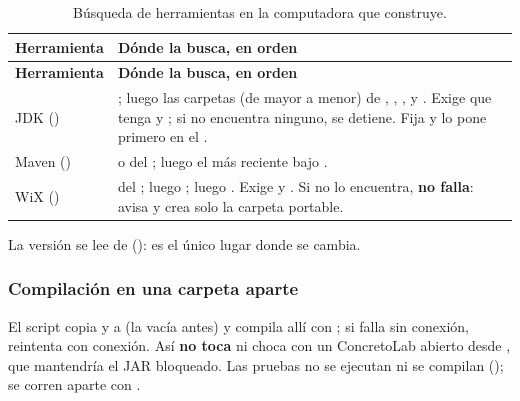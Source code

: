 \begin{longtable}{L{2.2cm}L{12.6cm}}
	\caption{Búsqueda de herramientas en la computadora que construye.} \label{tab:dis-herramientas} \\
	\hline
	\textbf{Herramienta} & \textbf{Dónde la busca, en orden} \\ \hline
	\endfirsthead
	\hline
	\textbf{Herramienta} & \textbf{Dónde la busca, en orden} \\ \hline
	\endhead
	\hline
	\endfoot
	JDK () & ; luego las carpetas  (de mayor a menor) de
	, , ,  y
	. Exige que tenga  y ; si no
	encuentra ninguno, se detiene. Fija  y lo pone primero en el . \\
	Maven () &  o  del ; luego el  más reciente bajo
	. \\
	WiX () &  del ; luego
	; luego
	. Exige  y
	. Si no lo encuentra, \textbf{no falla}: avisa y crea solo la carpeta portable. \\
\end{longtable}

La versión se lee de  (): es el único lugar donde se cambia.

\subsubsection{Compilación en una carpeta aparte}

El script copia  y  a  (la vacía antes)
y compila allí con ; si falla sin conexión, reintenta con
conexión. Así \textbf{no toca } ni choca con un ConcretoLab abierto desde
, que mantendría el JAR bloqueado. Las pruebas no se ejecutan ni se compilan
(); se corren aparte con .

